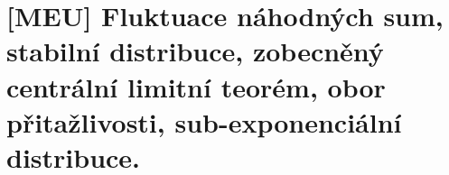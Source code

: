 \chapter{[MEU] Fluktuace náhodných sum, stabilní distribuce, zobecněný centrální limitní teorém, obor přitažlivosti, sub-exponenciální distribuce.}





